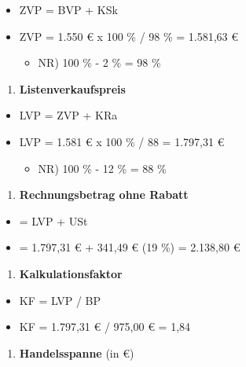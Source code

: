 \begin{itemize}
\item
  ZVP = BVP + KSk
\item
  ZVP = 1.550 € x 100 \% / 98 \% = 1.581,63 €

  \begin{itemize}
  \item
    NR) 100 \% - 2 \% = 98 \%
  \end{itemize}
\end{itemize}

\begin{enumerate}
\def\labelenumi{\alph{enumi})}
\setcounter{enumi}{1}
\item
  \textbf{Listenverkaufspreis}
\end{enumerate}

\begin{itemize}
\item
  LVP = ZVP + KRa
\item
  LVP = 1.581 € x 100 \% / 88 = 1.797,31 €

  \begin{itemize}
  \item
    NR) 100 \% - 12 \% = 88 \%
  \end{itemize}
\end{itemize}

\begin{enumerate}
\def\labelenumi{\alph{enumi})}
\setcounter{enumi}{2}
\item
  \textbf{Rechnungsbetrag ohne Rabatt}
\end{enumerate}

\begin{itemize}
\item
  = LVP + USt
\item
  = 1.797,31 € + 341,49 € (19 \%) = 2.138,80 €
\end{itemize}

\begin{enumerate}
\def\labelenumi{\alph{enumi})}
\setcounter{enumi}{3}
\item
  \textbf{Kalkulationsfaktor}
\end{enumerate}

\begin{itemize}
\item
  KF = LVP / BP
\item
  KF = 1.797,31 € / 975,00 € = 1,84
\end{itemize}

\begin{enumerate}
\def\labelenumi{\alph{enumi})}
\setcounter{enumi}{4}
\item
  \textbf{Handelsspanne} (in €)
\end{enumerate}

